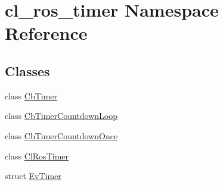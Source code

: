 \hypertarget{namespacecl__ros__timer}{}\section{cl\+\_\+ros\+\_\+timer Namespace Reference}
\label{namespacecl__ros__timer}
\subsection*{Classes}
\begin{DoxyCompactItemize}
\item 
class \hyperlink{classcl__ros__timer_1_1CbTimer}{Cb\+Timer}
\item 
class \hyperlink{classcl__ros__timer_1_1CbTimerCountdownLoop}{Cb\+Timer\+Countdown\+Loop}
\item 
class \hyperlink{classcl__ros__timer_1_1CbTimerCountdownOnce}{Cb\+Timer\+Countdown\+Once}
\item 
class \hyperlink{classcl__ros__timer_1_1ClRosTimer}{Cl\+Ros\+Timer}
\item 
struct \hyperlink{structcl__ros__timer_1_1EvTimer}{Ev\+Timer}
\end{DoxyCompactItemize}
